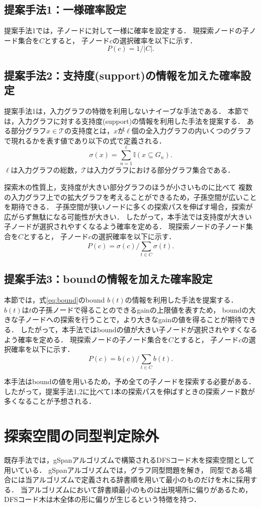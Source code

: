 \subsection{提案手法1：一様確率設定}
提案手法1では，子ノードに対して一様に確率を設定する．
現探索ノードの子ノード集合を$C$とすると，
子ノード$c$の選択確率を以下に示す．
\[
	P(c) = 1 / |C|.
\]

\subsection{提案手法2：支持度(support)の情報を加えた確率設定}
提案手法1は，入力グラフの特徴を利用しないナイーブな手法である．
本節では，入力グラフに対する支持度(support)の情報を利用した手法を提案する．
ある部分グラフ$x \in \mathcal{T}$の支持度とは，$x$が$\ell$個の全入力グラフの内いくつのグラフで現れるかを表す値であり以下の式で定義される．
\[
	\sigma(x) = \sum_{n=1}^{\ell} \mathbb{I} (x \subseteq G_n) .
\]
$\ell$は入力グラフの総数，$\mathcal{T}$は入力グラフにおける部分グラフ集合である．

探索木の性質上，支持度が大きい部分グラフのほうが小さいものに比べて
複数の入力グラフ上での拡大グラフを考えることができるため，子孫空間が広いことを期待できる．
子孫空間が狭いノードに多くの探索パスを伸ばす場合，探索が広がらず無駄になる可能性が大きい．
したがって，本手法では支持度が大きい子ノードが選択されやすくなるよう確率を定める．
現探索ノードの子ノード集合を$C$とすると，
子ノード$c$の選択確率を以下に示す．
\[
	P(c) = \sigma(c) / \sum_{t \in C} \sigma(t).
\]

\subsection{提案手法3：boundの情報を加えた確率設定}
本節では，式\eqref{eq:bound}のbound $b(t)$の情報を利用した手法を提案する．
$b(t)$は$t$の子孫ノードで得ることのできるgainの上限値を表すため，
boundの大きな子ノードへの探索を行うことで，より大きなgainの値を得ることが期待できる．
したがって，本手法ではboundの値が大きい子ノードが選択されやすくなるよう確率を定める．
現探索ノードの子ノード集合を$C$とすると，
子ノード$c$の選択確率を以下に示す．
\[
	P(c)  =  b(c) / \sum_{t \in C} b(t).
\]

本手法はboundの値を用いるため，予め全ての子ノードを探索する必要がある．
したがって，提案手法1,2に比べて1本の探索パスを伸ばすときの探索ノード数が多くなることが予想される．

\section{探索空間の同型判定除外}
\label{search space}
既存手法では，gSpan\cite{gSpan}アルゴリズムで構築されるDFSコード木を探索空間として用いている．
gSpanアルゴリズムでは，グラフ同型問題を解き，
同型である場合には当アルゴリズムで定義される辞書順を用いて最小のものだけを木に採用する．
当アルゴリズムにおいて辞書順最小のものは出現場所に偏りがあるため，
DFSコード木は木全体の形に偏りが生じるという特徴を持つ．

